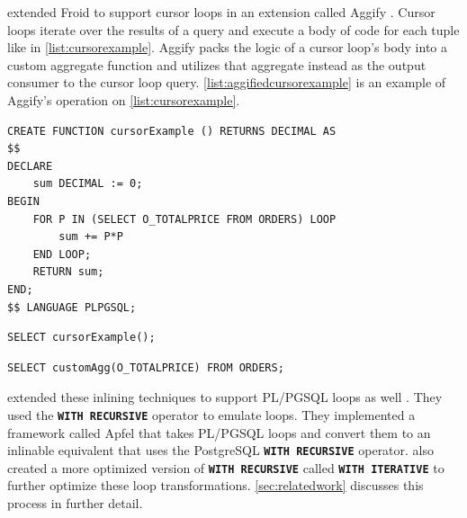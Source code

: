 \documentclass[12pt]{cmuthesis}
\newcommand{\dbSQL}[1]{\texttt{\textbf{#1}}\xspace}
\begin{document}
\citeauthor{gupta20} extended Froid to support cursor loops in an extension called Aggify \cite{gupta20}. Cursor loops iterate over the results of a query and execute a body of code for each tuple like in \cref{list:cursorexample}. Aggify packs the logic of a cursor loop's body into a custom aggregate function and utilizes that aggregate instead as the output consumer to the cursor loop query. \cref{list:aggifiedcursorexample} is an example of Aggify's operation on \cref{list:cursorexample}.\\

\begin{listing}
    \begin{verbatim}
CREATE FUNCTION cursorExample () RETURNS DECIMAL AS 
$$
DECLARE
    sum DECIMAL := 0;
BEGIN
    FOR P IN (SELECT O_TOTALPRICE FROM ORDERS) LOOP
        sum += P*P
    END LOOP;
    RETURN sum;
END;
$$ LANGUAGE PLPGSQL;
    \end{verbatim}
    \caption{Example of PL/PGSQL UDF that uses a cursor loop}
    \label{list:cursorexample}
    \end{listing}
    
\begin{listing}
    \begin{verbatim}
SELECT cursorExample();
    \end{verbatim}
    \caption{Invocation of \cref{list:cursorexample}}
    \label{list:cursorexampleinvocation}
    \end{listing}
 
    \begin{listing}
        \begin{verbatim}
SELECT customAgg(O_TOTALPRICE) FROM ORDERS;
        \end{verbatim}
        \caption{Aggify's output from operating on \cref{list:cursorexample}. \dbSQL{customAgg} is a dynamically created aggregate function that sums the squares of all elements given to it.}
        \label{list:aggifiedcursorexample}
        \end{listing}


\citeauthor{duta19} extended these inlining techniques to support PL/PGSQL loops as well \cite{duta19}. They used the \dbSQL{WITH RECURSIVE} operator to emulate loops. They implemented a framework called Apfel that takes PL/PGSQL loops and convert them to an inlinable equivalent that uses the PostgreSQL \dbSQL{WITH RECURSIVE} operator. \citeauthor{duta19} also created a more optimized version of \dbSQL{WITH RECURSIVE} called \dbSQL{WITH ITERATIVE} to further optimize these loop transformations. \cref{sec:relatedwork} discusses this process in further detail.\\
\end{document}
